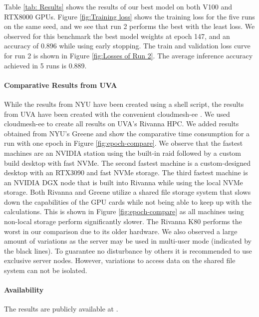 \documentclass[sigplan,screen]{acmart}
\begin{document}
Table \ref{tab: Results} shows the results of our best model on both V100 and RTX8000 GPUs. Figure \ref{fig:Training loss} shows the training loss for the five runs on the same seed, and we see that run 2 performs the best with the least loss. We observed for this benchmark the best model weights at epoch 147, and an accuracy of 0.896 while using early stopping. The train and validation loss curve for run 2 is shown in Figure \ref{fig:Losses of Run 2}. The average inference accuracy achieved in 5 runs is 0.889.

\paragraph{Comparative Results from UVA} While the results from NYU have been created using a shell script, the results from UVA have been created with the convenient cloudmesh-ee \cite{las-2023-ai-workflow,github-cloudmesh-ee}. We used cloudmesh-ee to create all results on UVA's Rivanna HPC. We added results obtained from NYU's Greene and show the comparative time consumption for a run with one epoch in Figure \ref{fig:epoch-compare}. We observe that the fastest machines are an NVIDIA station using the built-in raid followed by a custom build desktop with fast NVMe. 
The second fastest machine is a custom-designed desktop with an RTX3090 and fast NVMe storage.
The third fastest machine is an NVIDIA DGX node that is built into Rivanna while using the local NVMe storage. 
Both Rivanna and Greene utilize a shared file storage system that slows down the capabilities of the GPU cards while not being able to keep up with the calculations. This is shown in Figure \ref{fig:epoch-compare} as all machines using non-local storage perform significantly slower.
The Rivanna K80 performs the worst in our comparison due to its older hardware.
We also observed a large amount of variations as the server may be used in multi-user mode (indicated by the black lines). To guarantee no disturbance by others it is recommended to use exclusive server nodes. However, variations to access data on the shared file system can not be isolated.


\paragraph{Availability} The results are publicly available at \cite{www-mlcommons-cloudmask-results}.
\end{document}
